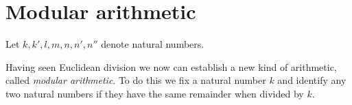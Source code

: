 \documentclass[../../arithmetic.ftl.tex]{subfiles}
\begin{document}
  \section{Modular arithmetic}

  \begin{forthel}
  \end{forthel}

  \begin{forthel}
    Let $k, k', l, m, n, n', n''$ denote natural numbers.
  \end{forthel}

  \noindent Having seen Euclidean division we now can establish a new kind of
  arithmetic, called \textit{modular arithmetic}. To do this we fix a natural
  number $k$ and identify any two natural numbers if they have the same
  remainder when divided by $k$.
\end{document}
